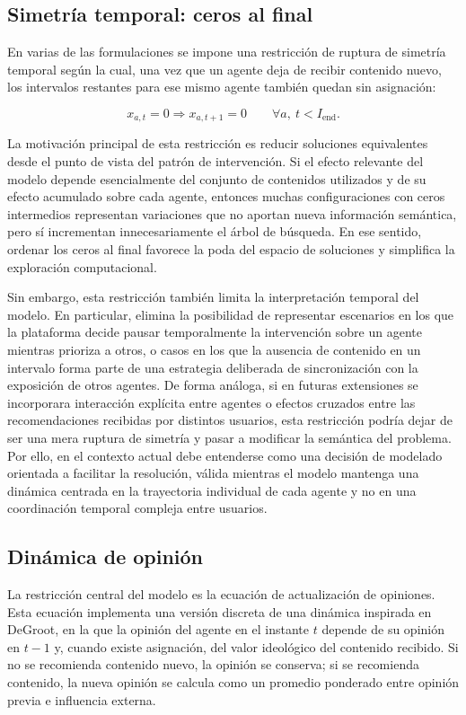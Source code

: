 \documentclass[10pt,letterpaper]{article}
\begin{document}
\subsection{Simetr\'ia temporal: ceros al final}

En varias de las formulaciones se impone una restricci\'on de ruptura de simetr\'ia temporal seg\'un la cual, una vez que un agente deja de recibir contenido nuevo, los intervalos restantes para ese mismo agente tambi\'en quedan sin asignaci\'on:

\[
x_{a,t}=0 \Rightarrow x_{a,t+1}=0 \qquad \forall a,\ t<I_{\text{end}}.
\]

La motivaci\'on principal de esta restricci\'on es reducir soluciones equivalentes desde el punto de vista del patr\'on de intervenci\'on. Si el efecto relevante del modelo depende esencialmente del conjunto de contenidos utilizados y de su efecto acumulado sobre cada agente, entonces muchas configuraciones con ceros intermedios representan variaciones que no aportan nueva informaci\'on sem\'antica, pero s\'i incrementan innecesariamente el \'arbol de b\'usqueda. En ese sentido, ordenar los ceros al final favorece la poda del espacio de soluciones y simplifica la exploraci\'on computacional.

Sin embargo, esta restricci\'on tambi\'en limita la interpretaci\'on temporal del modelo. En particular, elimina la posibilidad de representar escenarios en los que la plataforma decide pausar temporalmente la intervenci\'on sobre un agente mientras prioriza a otros, o casos en los que la ausencia de contenido en un intervalo forma parte de una estrategia deliberada de sincronizaci\'on con la exposici\'on de otros agentes. De forma an\'aloga, si en futuras extensiones se incorporara interacci\'on expl\'icita entre agentes o efectos cruzados entre las recomendaciones recibidas por distintos usuarios, esta restricci\'on podr\'ia dejar de ser una mera ruptura de simetr\'ia y pasar a modificar la sem\'antica del problema. Por ello, en el contexto actual debe entenderse como una decisi\'on de modelado orientada a facilitar la resoluci\'on, v\'alida mientras el modelo mantenga una din\'amica centrada en la trayectoria individual de cada agente y no en una coordinaci\'on temporal compleja entre usuarios.

\subsection{Din\'amica de opini\'on}

La restricci\'on central del modelo es la ecuaci\'on de actualizaci\'on de opiniones. Esta ecuaci\'on implementa una versi\'on discreta de una din\'amica inspirada en DeGroot, en la que la opini\'on del agente en el instante \(t\) depende de su opini\'on en \(t-1\) y, cuando existe asignaci\'on, del valor ideol\'ogico del contenido recibido. Si no se recomienda contenido nuevo, la opini\'on se conserva; si se recomienda contenido, la nueva opini\'on se calcula como un promedio ponderado entre opini\'on previa e influencia externa.
\end{document}
